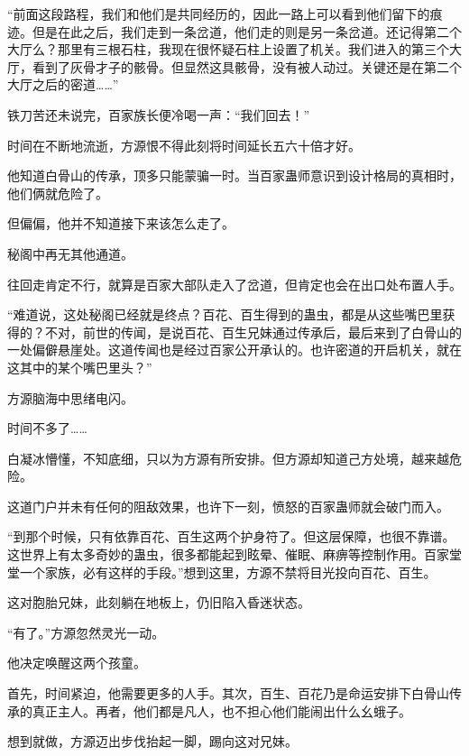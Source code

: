 \begin{this_body}
“前面这段路程，我们和他们是共同经历的，因此一路上可以看到他们留下的痕迹。但是在此之后，我们走到一条岔道，他们走的则是另一条岔道。还记得第二个大厅么？那里有三根石柱，我现在很怀疑石柱上设置了机关。我们进入的第三个大厅，看到了灰骨才子的骸骨。但显然这具骸骨，没有被人动过。关键还是在第二个大厅之后的密道……”

铁刀苦还未说完，百家族长便冷喝一声：“我们回去！”

时间在不断地流逝，方源恨不得此刻将时间延长五六十倍才好。

他知道白骨山的传承，顶多只能蒙骗一时。当百家蛊师意识到设计格局的真相时，他们俩就危险了。

但偏偏，他并不知道接下来该怎么走了。

秘阁中再无其他通道。

往回走肯定不行，就算是百家大部队走入了岔道，但肯定也会在出口处布置人手。

“难道说，这处秘阁已经就是终点？百花、百生得到的蛊虫，都是从这些嘴巴里获得的？不对，前世的传闻，是说百花、百生兄妹通过传承后，最后来到了白骨山的一处偏僻悬崖处。这道传闻也是经过百家公开承认的。也许密道的开启机关，就在这其中的某个嘴巴里头？”

方源脑海中思绪电闪。

时间不多了……

白凝冰懵懂，不知底细，只以为方源有所安排。但方源却知道己方处境，越来越危险。

这道门户并未有任何的阻敌效果，也许下一刻，愤怒的百家蛊师就会破门而入。

“到那个时候，只有依靠百花、百生这两个护身符了。但这层保障，也很不靠谱。这世界上有太多奇妙的蛊虫，很多都能起到眩晕、催眠、麻痹等控制作用。百家堂堂一个家族，必有这样的手段。”想到这里，方源不禁将目光投向百花、百生。

这对胞胎兄妹，此刻躺在地板上，仍旧陷入昏迷状态。

“有了。”方源忽然灵光一动。

他决定唤醒这两个孩童。

首先，时间紧迫，他需要更多的人手。其次，百生、百花乃是命运安排下白骨山传承的真正主人。再者，他们都是凡人，也不担心他们能闹出什么幺蛾子。

想到就做，方源迈出步伐抬起一脚，踢向这对兄妹。

\end{this_body}

